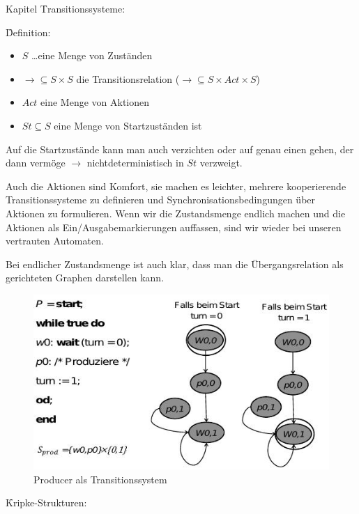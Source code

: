 \begin{chapter}{Kapitel}
\f{Transitionssysteme}:

\f{Definition}: 
\begin{itemize}
 \item $S$ \dots eine Menge von Zuständen 
 \item $\rightarrow \subseteq S\times S$ die Transitionsrelation ($\rightarrow \subseteq S\times Act \times S$)
 \item $Act$ eine Menge von Aktionen 
 \item $St \subseteq S$ eine Menge von Startzuständen ist 
\end{itemize}

\noindent Auf die Startzustände kann man auch verzichten oder auf genau einen gehen, der dann vermöge $\rightarrow$ nichtdeterministisch in $St$ verzweigt.
\vspace*{4pt}

\noindent Auch die Aktionen sind Komfort, sie machen es leichter, mehrere kooperierende Transitionssysteme zu definieren und Synchronisationsbedingungen über Aktionen zu 
formulieren. Wenn wir die Zustandsmenge endlich machen und die Aktionen als Ein/Ausgabemarkierungen auffassen, sind wir wieder bei unseren vertrauten Automaten.
\vspace*{4pt}

\noindent Bei endlicher Zustandsmenge ist auch klar, dass man die Übergangsrelation als gerichteten Graphen darstellen kann. 
\begin{figure}[!ht]
 \centering
 \includegraphics[scale=0.8]{pics/transitionssystem}
 \caption{Producer als Transitionssystem}
\end{figure}

\f{Kripke-Strukturen}:
\vspace*{4pt}


\end{chapter}
